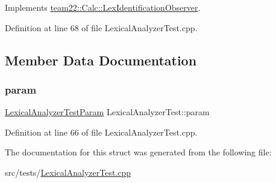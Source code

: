 Implements \hyperlink{classteam22_1_1_calc_1_1_lex_identification_observer_ac139f75c560625ec6fdb2e34cf0d4884}{team22\+::\+Calc\+::\+Lex\+Identification\+Observer}.



Definition at line 68 of file Lexical\+Analyzer\+Test.\+cpp.



\subsection{Member Data Documentation}
\mbox{\label{struct_lexical_analyzer_test_ad6d61cc18154fb0f6b92eb10d840dc35}} 
\subsubsection{\texorpdfstring{param}{param}}
{\footnotesize\ttfamily \hyperlink{struct_lexical_analyzer_test_param}{Lexical\+Analyzer\+Test\+Param} Lexical\+Analyzer\+Test\+::param}



Definition at line 66 of file Lexical\+Analyzer\+Test.\+cpp.



The documentation for this struct was generated from the following file\+:\begin{DoxyCompactItemize}
\item 
src/tests/\hyperlink{_lexical_analyzer_test_8cpp}{Lexical\+Analyzer\+Test.\+cpp}\end{DoxyCompactItemize}

